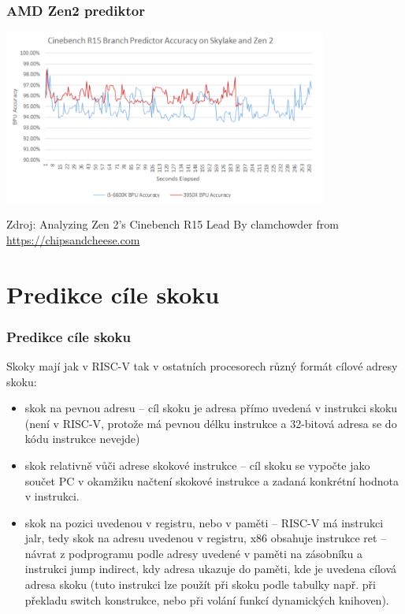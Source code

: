 \documentclass{beamer}
\begin{document}
\begin{frame}
\frametitle{AMD Zen2 prediktor}

\begin{center}
\includegraphics[width=0.8\textwidth]{fig/amd_cinebench.png}
\end{center}

Zdroj: Analyzing Zen 2’s Cinebench R15 Lead
By clamchowder from \url{https://chipsandcheese.com}
\end{frame}

\section{Predikce cíle skoku}

\begin{frame}
\frametitle{Predikce cíle skoku}

Skoky mají jak v RISC-V tak v ostatních procesorech různý formát cílové adresy skoku:
\begin{itemize}
\item skok na pevnou adresu -- cíl skoku je adresa přímo uvedená v instrukci skoku (není v RISC-V, protože má pevnou délku instrukce a 32-bitová adresa se do kódu instrukce nevejde)
\item skok relativně vůči adrese skokové instrukce -- cíl skoku se vypočte jako součet PC v okamžiku načtení skokové instrukce a zadaná konkrétní hodnota v instrukci.
\item skok na pozici uvedenou v registru, nebo v paměti -- RISC-V má instrukci jalr, tedy skok na adresu uvedenou v registru, x86 obsahuje instrukce ret -- návrat z podprogramu podle adresy uvedené v paměti na zásobníku a instrukci jump indirect, kdy adresa ukazuje do paměti, kde je uvedena cílová adresa skoku (tuto instrukci lze použít při skoku podle tabulky např. při překladu switch konstrukce, nebo při volání funkcí dynamických knihoven). 
\end{itemize}
\end{frame}
\end{document}
